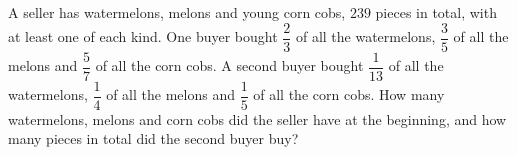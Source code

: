A seller has watermelons, melons and young corn cobs, $239$ pieces in total, with at least one of each kind. One buyer bought $\dfrac{2}{3}$ of all the watermelons, $\dfrac{3}{5}$ of all the melons and $\dfrac{5}{7}$ of all the corn cobs. A second buyer bought $\dfrac{1}{13}$ of all the watermelons, $\dfrac{1}{4}$ of all the melons and $\dfrac{1}{5}$ of all the corn cobs. How many watermelons, melons and corn cobs did the seller have at the beginning, and how many pieces in total did the second buyer buy?
